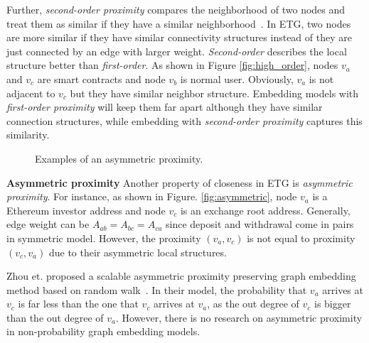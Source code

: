 Further, \emph{second-order proximity} compares the neighborhood of two nodes and treat them as similar if they have a similar neighborhood~\cite{goyal2018graph}. In ETG, two nodes are more similar if they have similar connectivity structures instead of they are just connected by an edge with larger weight. \emph{Second-order} describes the local structure better than \emph{first-order}. As shown in Figure \ref{fig:high_order}, nodes $v_a$ and $v_c$ are smart contracts and node $v_b$ is normal user. Obviously, $v_a$ is not adjacent to $v_c$  but they have similar neighbor structure. Embedding models with \emph{first-order proximity} will keep them far apart although they have similar connection structures, while embedding with \emph{second-order proximity} captures this similarity.


\begin{figure}[htbp]
	\centering
	\caption{Examples of an asymmetric proximity.}

\end{figure}

\textbf{Asymmetric proximity}
Another property of closeness in ETG is \emph{asymmetric proximity}. For instance, as shown in Figure. \ref{fig:asymmetric}, node $v_a$ is a Ethereum investor address and node $v_c$ is an exchange root address. Generally, edge weight can be $A_{ab}=A_{bc}=A_{ca}$ since deposit and withdrawal come in pairs in symmetric model. However, the proximity $(v_a,v_c)$ is not equal to proximity $(v_c,v_a)$ due to their asymmetric local structures.

 Zhou et. proposed a scalable asymmetric proximity preserving graph embedding method based on random walk~\cite{zhou2017scalable}. In their model, the probability that $v_a$ arrives at $v_c$ is far less than the one that $v_c$ arrives at $v_a$, as the out degree of $v_c$ is bigger than the out degree of $v_a$. 
However, there is no research on asymmetric proximity in non-probability graph embedding models.


